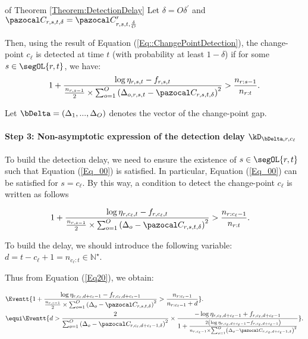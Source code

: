 \documentclass{article} %
\begin{document}
\begin{myproof}{of Theorem \ref{Theorem:DetectionDelay}}
Let $\delta = O\delta^\prime$ and $\pC_{r,s,t,\delta} = \pC^\prime_{r,s,t,\frac{\delta}{O}}$ 
 
Then, using the result of Equation (\ref{Eq::ChangePointDetection}), the change-point $c_\ell$ is detected at time $t$ (with probability at least $1-\delta$) if for some $s \in \segOL{r,t}$, we have:
	\begin{align}
	1+ \frac{\log \eta_{r,s,t} - f_{r,s,t} }{			\frac{n_{r,s-1}}{2} \times \sum_{o=1}^{O} \left(\Delta_{o,r,s,t} - \pC_{r,s,t,\delta}  \right)^2} > \frac{n_{r:s-1}}{n_{r:t}}.
	\label{Eq_00}
	\end{align}

Let $\bDelta = \left(\Delta_1,...,\Delta_O \right)$ denotes the vector of the change-point gap.
 
	\paragraph{Step 3: Non-asymptotic expression of the detection delay $\kD_{\bDelta,r,c_\ell}$}	
	
	To build the detection delay, we need to ensure the existence of $s \in \segOL{r,t}$ such that Equation (\ref{Eq_00}) is satisfied. In particular, Equation (\ref{Eq_00}) can be satisfied for $s = c_\ell$.
	By this way, a condition to detect the change-point $c_\ell$ is written as follows
	
	\begin{align}
	&		1+ \frac{\log \eta_{r,c_\ell,t} - f_{r,c_\ell,t} }{			\frac{n_{r,s-1}}{2} \times \sum_{o=1}^{O} \left(\Delta_{o} - \pC_{r,s,t,\delta}  \right)^2} > \frac{n_{r:c_\ell-1}}{n_{r:t}}.
	\label{Eq20}
	\end{align}
	
	
	To build the delay, we should introduce the following variable: $d = t-c_\ell+1 = n_{c_\ell:t} \in \mathbb{N}^\star $.
	
	Thus from Equation (\ref{Eq20}), we obtain:
	
	\begin{align*}
	& \Eventt{1+ \frac{\log \eta_{r,c_\ell,d+c_\ell-1} - f_{r,c_\ell,d+c_\ell-1}}{\frac{n_{r,s-1}}{2} \times \sum_{o=1}^{O} \left(\Delta_{o} - \pC_{r,s,t,\delta}  \right)^2} > \frac{n_{r:c_\ell-1}}{n_{r:c_\ell-1} + d}}.
  \\
	& \equi \Eventt{d > \frac{2}{\sum_{o=1}^{O}\left(\Delta_o - \pC_{r,c_\ell, d+ c_\ell-1 ,\delta}  \right)^2}\times \frac{-\log \eta_{r,c_\ell,d+c_\ell-1} + f_{r,c_\ell,d+c_\ell-1}}{1+\frac{2\left(\log \eta_{r,c_\ell,d+c_\ell-1} - f_{r,c_\ell,d+c_\ell-1}\right)}{n_{r,c_\ell-1}\times   \sum_{o=1}^{O}\left(\Delta_o - \pC_{r,c_\ell, d+ c_\ell-1 ,\delta}  \right)^2}}}.
	\end{align*}
	

\end{myproof}
\end{document}
